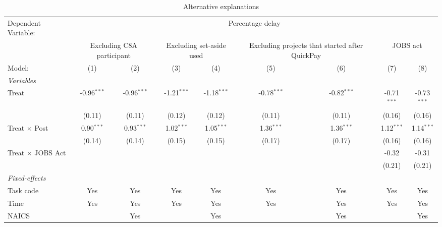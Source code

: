 \documentclass[
]{article}
\begin{document}
\begin{table}[htbp]
   \caption{Alternative explanations}
   \centering
   \tiny
   \begin{tabular}{lcccccccc}
      \tabularnewline \midrule \midrule
      Dependent Variable: & \multicolumn{8}{c}{Percentage delay}\\
       & \multicolumn{2}{c}{Excluding C8A participant} & \multicolumn{2}{c}{Excluding set-aside used} & \multicolumn{2}{c}{Excluding projects that started after QuickPay} & \multicolumn{2}{c}{JOBS act} \\ 
      Model:                   & (1)           & (2)           & (3)           & (4)           & (5)           & (6)           & (7)           & (8)\\  
      \midrule
      \emph{Variables}\\
      Treat                    & -0.96$^{***}$ & -0.96$^{***}$ & -1.21$^{***}$ & -1.18$^{***}$ & -0.78$^{***}$ & -0.82$^{***}$ & -0.71$^{***}$ & -0.73$^{***}$\\   
                               & (0.11)        & (0.11)        & (0.12)        & (0.12)        & (0.11)        & (0.11)        & (0.16)        & (0.16)\\   
      Treat $\times$ Post      & 0.90$^{***}$  & 0.93$^{***}$  & 1.02$^{***}$  & 1.05$^{***}$  & 1.36$^{***}$  & 1.36$^{***}$  & 1.12$^{***}$  & 1.14$^{***}$\\   
                               & (0.14)        & (0.14)        & (0.15)        & (0.15)        & (0.17)        & (0.17)        & (0.16)        & (0.16)\\   
      Treat $\times$ JOBS Act  &               &               &               &               &               &               & -0.32         & -0.31\\   
                               &               &               &               &               &               &               & (0.21)        & (0.21)\\   
      \midrule
      \emph{Fixed-effects}\\
      Task code                & Yes           & Yes           & Yes           & Yes           & Yes           & Yes           & Yes           & Yes\\  
      Time                     & Yes           & Yes           & Yes           & Yes           & Yes           & Yes           & Yes           & Yes\\  
      NAICS                    &               & Yes           &               & Yes           &               & Yes           &               & Yes\\  

\end{tabular}
\end{table}
\end{document}
